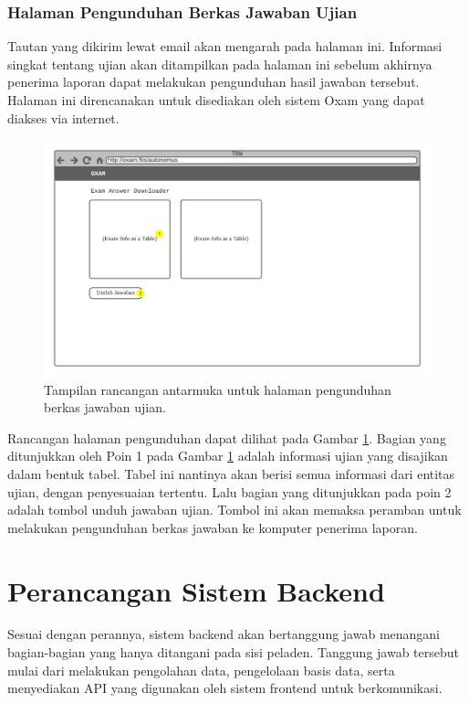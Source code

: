 \subsubsection{Halaman Pengunduhan Berkas Jawaban Ujian}
    Tautan yang dikirim lewat email akan mengarah pada halaman ini. Informasi singkat tentang ujian
    akan ditampilkan pada halaman ini sebelum akhirnya penerima laporan dapat melakukan pengunduhan hasil
    jawaban tersebut. Halaman ini direncanakan untuk disediakan oleh sistem Oxam yang dapat diakses
    via internet.
    
    \begin{figure}
        \centering
        \includegraphics[width=0.7\paperwidth]{Gambar/mockups/Mockup--Tambahan - Exam-extractor.pdf}
        \caption{Tampilan rancangan antarmuka untuk halaman pengunduhan berkas jawaban ujian.}
        \label{fig:mockup_addition_downloader}
    \end{figure}
    Rancangan halaman pengunduhan dapat dilihat pada Gambar \ref{fig:mockup_addition_downloader}.
    Bagian yang ditunjukkan oleh Poin 1 pada Gambar \ref{fig:mockup_addition_downloader} adalah 
    informasi ujian yang disajikan dalam bentuk tabel. Tabel ini nantinya akan berisi semua
    informasi dari entitas ujian, dengan penyesuaian tertentu. Lalu bagian yang ditunjukkan pada
    poin 2 adalah tombol unduh jawaban ujian. Tombol ini akan memaksa peramban untuk melakukan
    pengunduhan berkas jawaban ke komputer penerima laporan.
    
\section{Perancangan Sistem Backend}
    Sesuai dengan perannya, sistem backend akan bertanggung jawab menangani bagian-bagian yang hanya 
    ditangani pada sisi peladen. Tanggung jawab tersebut mulai dari melakukan pengolahan data,
    pengelolaan basis data, serta menyediakan API yang digunakan oleh sistem frontend untuk
    berkomunikasi.
    
